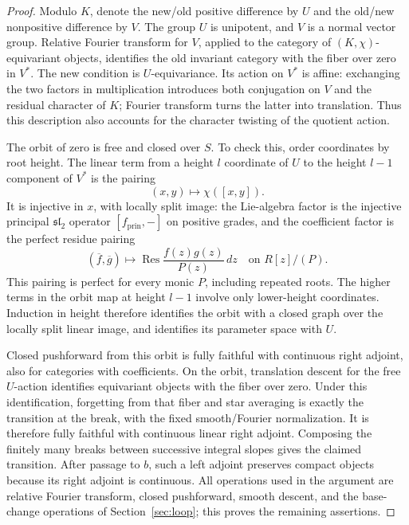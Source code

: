 \begin{proof}
Modulo \(K\), denote the new/old positive difference by \(U\) and the
old/new nonpositive difference by \(V\).  The group \(U\) is unipotent,
and \(V\) is a normal vector group.  Relative Fourier transform for
\(V\), applied to the category of \((K,\chi)\)-equivariant objects,
identifies the old invariant category with the fiber over zero in
\(V^*\).  The new condition is \(U\)-equivariance.  Its action on
\(V^*\) is affine: exchanging the two factors in multiplication
introduces both conjugation on \(V\) and the residual character of
\(K\); Fourier transform turns the latter into translation.  Thus
this description also accounts for the character twisting of the
quotient action.

The orbit of zero is free and closed over \(S\).  To check this,
order coordinates by root height.  The linear term from a height
\(l\) coordinate of \(U\) to the height \(l-1\) component of
\(V^*\) is the pairing
\[
 (x,y)\longmapsto\chi([x,y]).
\]
It is injective in \(x\), with locally split image: the Lie-algebra
factor is the injective principal \(\mathfrak{sl}_2\) operator
\([f_{\mathrm{prin}},-]\) on positive grades, and the coefficient
factor is the perfect residue pairing
\[
 (\overline f,\overline g)\longmapsto
       \operatorname{Res}\frac{f(z)g(z)}{P(z)}\,dz
       \quad\text{on }R[z]/(P).
\]
This pairing is perfect for every monic \(P\), including repeated
roots.  The higher terms in the orbit map at height \(l-1\) involve
only lower-height coordinates.  Induction in height therefore identifies
the orbit with a closed graph over the locally split linear image,
and identifies its parameter space with \(U\).

Closed pushforward from this orbit is fully faithful with continuous
right adjoint, also for categories with coefficients.  On the orbit,
translation descent for the free \(U\)-action identifies equivariant
objects with the fiber over zero.  Under this identification, forgetting
from that fiber and star averaging is exactly the transition at the
break, with the fixed smooth/Fourier normalization.  It is therefore
fully faithful with continuous linear right adjoint.  Composing the
finitely many breaks between successive integral slopes gives the
claimed transition.  After passage to \(b\), such a left adjoint
preserves compact objects because its right adjoint is continuous.  All operations used in the
argument are relative Fourier transform, closed pushforward, smooth
descent, and the base-change operations of Section~\ref{sec:loop};
this proves the remaining assertions.
\end{proof}

